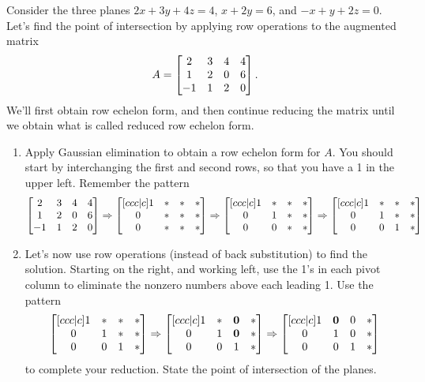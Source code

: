 \begin{problem}
Consider the three planes 
$2x+3y+4z=4$, 
$x+2y=6$, and 
$-x+y+2z=0$. 
Let's find the point of intersection by applying row operations to the augmented matrix
$$
A
=
\begin{bmatrix} 
2&3&4&4\\
1&2&0&6\\
-1&1&2&0
 \end{bmatrix}.$$ We'll first obtain row echelon form, and then continue reducing the matrix until we obtain what is called reduced row echelon form.%
\begin{enumerate}
 \item Apply Gaussian elimination to obtain a row echelon form for $A$. You should start by interchanging the first and second rows, so that you have a 1 in the upper left. Remember the pattern 
$$
\begin{bmatrix} 
2&3&4&4\\
1&2&0&6\\
-1&1&2&0
 \end{bmatrix}
\Rightarrow
\begin{bmatrix} [ccc|c]
1 & * & * & * \\
0 & * & * & * \\
0 & * & * & * \\
 \end{bmatrix}
\Rightarrow
\begin{bmatrix} [ccc|c]
1 & * & * & * \\
0 & 1 & * & * \\
0 & 0 & * & * \\
 \end{bmatrix}
\Rightarrow
\begin{bmatrix} [ccc|c]
1 & * & * & * \\
0 & 1 & * & * \\
0 & 0 & 1 & * \\
 \end{bmatrix}
$$
\item Let's now use row operations (instead of back substitution) to find the solution.  Starting on the right, and working left, use the 1's in each pivot column to eliminate the nonzero numbers above each leading 1. Use the pattern 
$$
\begin{bmatrix} [ccc|c]
1 & * & * & * \\
0 & 1 & * & * \\
0 & 0 & 1 & * \\
 \end{bmatrix}
\Rightarrow
\begin{bmatrix} [ccc|c]
1 & * & {\bf 0} & * \\
0 & 1 & {\bf 0} & * \\
0 & 0 & 1 & * \\
 \end{bmatrix}
\Rightarrow
\begin{bmatrix} [ccc|c]
1 & {\bf 0} & 0 & * \\
0 & 1 & 0 & * \\
0 & 0 & 1 & * \\
 \end{bmatrix}
$$
to complete your reduction. State the point of intersection of the planes.
\end{enumerate}
\end{problem}


